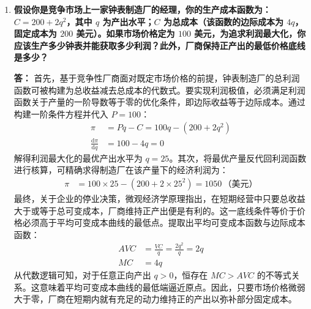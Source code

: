 \begin{enumerate}[label=\textbf{\arabic*.}, leftmargin=*]
\begin{center}
		\end{center}
		
		\item \textbf{假设你是竞争市场上一家钟表制造厂的经理，你的生产成本函数为：$C = 200 + 2q^{2}$，其中 $q$ 为产出水平；$C$ 为总成本（该函数的边际成本为 $4q$，固定成本为 $200$ 美元）。如果市场价格定为 $100$ 美元，为追求利润最大化，你应该生产多少钟表并能获取多少利润？此外，厂商保持正产出的最低价格底线是多少？}
		
		\textbf{答：}
		首先，基于竞争性厂商面对既定市场价格的前提，钟表制造厂的总利润函数可被构建为总收益减去总成本的代数式。要实现利润极值，必须满足利润函数关于产量的一阶导数等于零的优化条件，即边际收益等于边际成本。通过构建一阶条件方程并代入 $P = 100$：
		\[
		\begin{aligned}
			\pi &= P q - C = 100 q - (200 + 2q^{2}) \\
			\frac{\mathrm{d}\pi}{\mathrm{d}q} &= 100 - 4q = 0
		\end{aligned}
		\]
		解得利润最大化的最优产出水平为 $q = 25$。其次，将最优产量反代回利润函数进行核算，可精确求得制造厂在该产量下的经济利润为：
		\[
		\begin{aligned}
			\pi &= 100 \times 25 - (200 + 2 \times 25^{2}) = 1050 \, \text{（美元）}
		\end{aligned}
		\]
		最终，关于企业的停业决策，微观经济学原理指出，在短期经营中只要总收益大于或等于总可变成本，厂商维持正产出便是有利的。这一底线条件等价于价格必须高于平均可变成本曲线的最低点。提取出平均可变成本函数与边际成本函数：
		\[
		\begin{aligned}
			AVC &= \frac{VC}{q} = \frac{2q^{2}}{q} = 2q \\
			MC &= 4q
		\end{aligned}
		\]
		从代数逻辑可知，对于任意正向产出 $q > 0$，恒存在 $MC > AVC$ 的不等式关系。这意味着平均可变成本曲线的最低端逼近原点。因此，只要市场价格微弱大于零，厂商在短期内就有充足的动力维持正的产出以弥补部分固定成本。
		

\end{enumerate}
